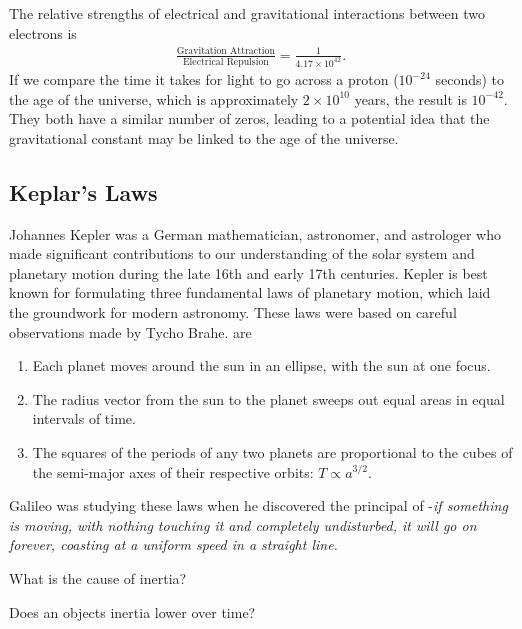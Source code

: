 \begin{interestnote}
	The relative strengths of electrical and gravitational interactions between two electrons is
 	\begin{align}
  		\frac{\text{Gravitation Attraction}}{\text{Electrical Repulsion}} = \frac{1}{4.17\times 10^{42}}.
  	\end{align}
   	If we compare the time it takes for light to go across a proton ($10^{-24}$ seconds) to the age of the universe, which is approximately $2\times 10^{10}$ years, the result is $10^{-42}$. They both have a similar number of zeros, leading to a potential idea that the gravitational constant may be linked to the age of the universe.
\end{interestnote}

\subsection{Keplar's Laws}

Johannes Kepler was a German mathematician, astronomer, and astrologer who made significant contributions to our understanding of the solar system and planetary motion during the late 16th and early 17th centuries. Kepler is best known for formulating three fundamental laws of planetary motion, which laid the groundwork for modern astronomy. These laws were based on careful observations made by Tycho Brahe.  are
\begin{enumerate}
	\item Each planet moves around the sun in an ellipse, with the sun at one focus.
 	\item The radius vector from the sun to the planet sweeps out equal areas in equal intervals of time.
  	\item The squares of the periods of any two planets are proportional to the cubes of the semi-major axes of their respective orbits: $T\propto a^{3/2}$.
\end{enumerate}

Galileo was studying these laws when he discovered the principal of -\textit{if something is moving, with nothing touching it and completely undisturbed, it will go on forever, coasting at a uniform speed in a straight line.}

\begin{questions}
	\item What is the cause of inertia?
 	\item Does an objects inertia lower over time?
\end{questions}

